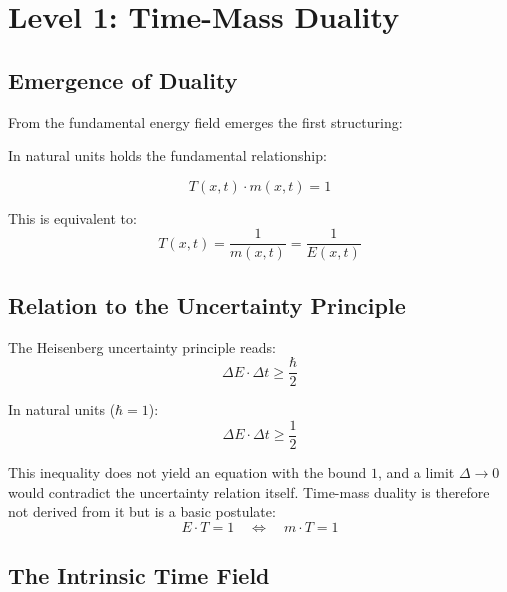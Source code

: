 	\section{Level 1: Time-Mass Duality}
	
	\subsection{Emergence of Duality}
	
	From the fundamental energy field emerges the first structuring:
	
	\begin{keyresult}
		In natural units holds the fundamental relationship:
		
		\begin{equation}
			\boxed{T(x,t) \cdot m(x,t) = 1}
		\end{equation}
		
		This is equivalent to:
		\begin{equation}
			T(x,t) = \frac{1}{m(x,t)} = \frac{1}{E(x,t)}
		\end{equation}
	\end{keyresult}
	
	\subsection{Relation to the Uncertainty Principle}
	
	The Heisenberg uncertainty principle reads:
	\begin{equation}
		\Delta E \cdot \Delta t \geq \frac{\hbar}{2}
	\end{equation}
	
	In natural units ($\hbar = 1$):
	\begin{equation}
		\Delta E \cdot \Delta t \geq \frac{1}{2}
	\end{equation}
	
	This inequality does not yield an equation with the bound $1$, and a limit $\Delta \to 0$ would contradict the uncertainty relation itself. Time-mass duality is therefore not derived from it but is a basic postulate:
	\begin{equation}
		E \cdot T = 1 \quad \Leftrightarrow \quad m \cdot T = 1
	\end{equation}
	
	\subsection{The Intrinsic Time Field}
	

